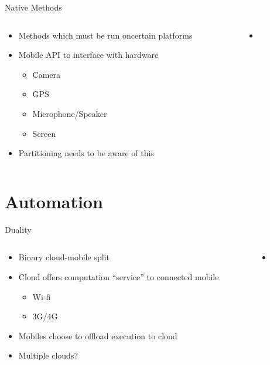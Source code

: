 \documentclass{beamer}
\begin{document}
\begin{frame}{Native Methods}
\begin{columns}
\begin{column}{5cm}
\begin{itemize}
	\item Methods which must be run oncertain platforms
	\item Mobile API to interface with hardware
	\begin{itemize}
		\item Camera
		\item GPS
		\item Microphone/Speaker
		\item Screen
	\end{itemize}
	\item Partitioning needs to be aware of this
\end{itemize}
\end{column}
\begin{column}{5cm}
\begin{itemize}
	\begin{itemize}
		\item {}
	\end{itemize}
\end{itemize}
\end{column}
\end{columns}
\end{frame}

\section{Automation}

\begin{frame}{Duality}
\begin{columns}
\begin{column}{5cm}
\begin{itemize}
	\item Binary cloud-mobile split
	\item Cloud offers computation ``service'' to connected mobile
	\begin{itemize}
		\item Wi-fi
		\item 3G/4G
	\end{itemize}
	\item Mobiles choose to offload execution to cloud
	\item Multiple clouds?
\end{itemize}
\end{column}
\begin{column}{5cm}
\begin{itemize}
	\begin{itemize}
		\item {}
	\end{itemize}
\end{itemize}
\end{column}
\end{columns}
\end{frame}
\end{document}
